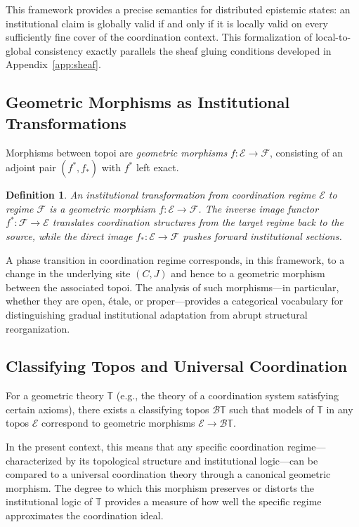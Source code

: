 \documentclass[12pt]{article}
\newtheorem{definition}[theorem]{Definition}
\begin{document}
This framework provides a precise semantics for distributed epistemic states: an institutional claim is globally valid if and only if it is locally valid on every sufficiently fine cover of the coordination context. This formalization of local-to-global consistency exactly parallels the sheaf gluing conditions developed in Appendix~\ref{app:sheaf}.

\subsection{Geometric Morphisms as Institutional Transformations}

Morphisms between topoi are \emph{geometric morphisms} $f : \mathcal{E} \to \mathcal{F}$, consisting of an adjoint pair $(f^*, f_*)$ with $f^*$ left exact.

\begin{definition}
An institutional transformation from coordination regime $\mathcal{E}$ to regime $\mathcal{F}$ is a geometric morphism $f : \mathcal{E} \to \mathcal{F}$. The inverse image functor $f^* : \mathcal{F} \to \mathcal{E}$ translates coordination structures from the target regime back to the source, while the direct image $f_* : \mathcal{E} \to \mathcal{F}$ pushes forward institutional sections.
\end{definition}

A phase transition in coordination regime corresponds, in this framework, to a change in the underlying site $(C,J)$ and hence to a geometric morphism between the associated topoi. The analysis of such morphisms---in particular, whether they are open, \'{e}tale, or proper---provides a categorical vocabulary for distinguishing gradual institutional adaptation from abrupt structural reorganization.

\subsection{Classifying Topos and Universal Coordination}

For a geometric theory $\mathbb{T}$ (e.g., the theory of a coordination system satisfying certain axioms), there exists a classifying topos $\mathcal{B}\mathbb{T}$ such that models of $\mathbb{T}$ in any topos $\mathcal{E}$ correspond to geometric morphisms $\mathcal{E} \to \mathcal{B}\mathbb{T}$.

In the present context, this means that any specific coordination regime---characterized by its topological structure and institutional logic---can be compared to a universal coordination theory through a canonical geometric morphism. The degree to which this morphism preserves or distorts the institutional logic of $\mathbb{T}$ provides a measure of how well the specific regime approximates the coordination ideal.
\end{document}
